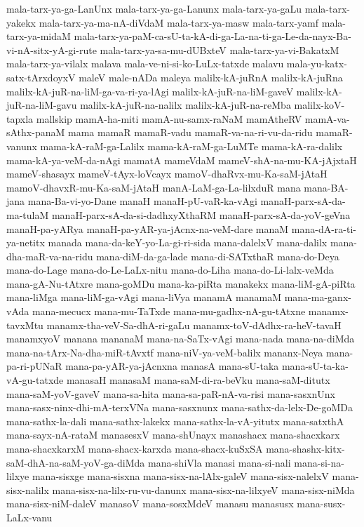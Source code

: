 {mala-tarx-ya-ga-LanUnx
mala-tarx-ya-ga-Lanunx
mala-tarx-ya-gaLu
mala-tarx-yakekx
mala-tarx-ya-ma-nA-diVdaM
mala-tarx-ya-masw
mala-tarx-yamf
mala-tarx-ya-midaM
mala-tarx-ya-paM-ca-sU-ta-kA-di-ga-La-na-ti-ga-Le-da-nayx-Ba-vi-nA-sitx-yA-gi-rute
mala-tarx-ya-sa-mu-dUBxteV
mala-tarx-ya-vi-BakatxM
mala-tarx-ya-vilalx
malava
mala-ve-ni-si-ko-LuLx-tatxde
malavu
mala-yu-katx-satx-tArxdoyxV
maleV
male-nADa
maleya
malilx-kA-juRnA
malilx-kA-juRna
malilx-kA-juR-na-liM-ga-va-ri-ya-lAgi
malilx-kA-juR-na-liM-gaveV
malilx-kA-juR-na-liM-gavu
malilx-kA-juR-na-nalilx
malilx-kA-juR-na-reMba
malilx-koV-tapxla
mallskip
mamA-ha-miti
mamA-nu-samx-raNaM
mamAtheRV
mamA-va-sAthx-panaM
mama
mamaR
mamaR-vadu
mamaR-va-na-ri-vu-da-ridu
mamaR-vanunx
mama-kA-raM-ga-Lalilx
mama-kA-raM-ga-LuMTe
mama-kA-ra-dalilx
mama-kA-ya-veM-da-nAgi
mamatA
mameVdaM
mameV-shA-na-mu-KA-jAjxtaH
mameV-shasayx
mameV-tAyx-loVcayx
mamoV-dhaRvx-mu-Ka-saM-jAtaH
mamoV-dhavxR-mu-Ka-saM-jAtaH
manA-LaM-ga-La-lilxduR
mana
mana-BA-jana
mana-Ba-vi-yo-Dane
manaH
manaH-pU-vaR-ka-vAgi
manaH-parx-sA-da-ma-tulaM
manaH-parx-sA-da-si-dadhxyXthaRM
manaH-parx-sA-da-yoV-geVna
manaH-pa-yARya
manaH-pa-yAR-ya-jAcnx-na-veM-dare
manaM
mana-dA-ra-ti-ya-netitx
manada
mana-da-keY-yo-La-gi-ri-sida
mana-dalelxV
mana-dalilx
mana-dha-maR-va-na-ridu
mana-diM-da-ga-lade
mana-di-SATxthaR
mana-do-Deya
mana-do-Lage
mana-do-Le-LaLx-nitu
mana-do-Liha
mana-do-Li-lalx-veMda
mana-gA-Nu-tAtxre
mana-goMDu
mana-ka-piRta
manakekx
mana-liM-gA-piRta
mana-liMga
mana-liM-ga-vAgi
mana-liVya
manamA
manamaM
mana-ma-ganx-vAda
mana-mecucx
mana-mu-TaTxde
mana-mu-gadhx-nA-gu-tAtxne
manamx-tavxMtu
manamx-tha-veV-Sa-dhA-ri-gaLu
manamx-toV-dAdhx-ra-heV-tavaH
manamxyoV
manana
mananaM
mana-na-SaTx-vAgi
mana-nada
mana-na-diMda
mana-na-tArx-Na-dha-miR-tAvxtf
mana-niV-ya-veM-balilx
mananx-Neya
mana-pa-ri-pUNaR
mana-pa-yAR-ya-jAcnxna
manasA
mana-sU-taka
mana-sU-ta-ka-vA-gu-tatxde
manasaH
manasaM
mana-saM-di-ra-beVku
mana-saM-ditutx
mana-saM-yoV-gaveV
mana-sa-hita
mana-sa-paR-nA-va-risi
mana-sasxnUnx
mana-sasx-ninx-dhi-mA-terxVNa
mana-sasxnunx
mana-sathx-da-lelx-De-goMDa
mana-sathx-la-dali
mana-sathx-lakekx
mana-sathx-la-vA-yitutx
mana-satxthA
mana-sayx-nA-rataM
manasesxV
mana-shUnayx
manashacx
mana-shacxkarx
mana-shacxkarxM
mana-shacx-karxda
mana-shacx-kuSxSA
mana-shashx-kitx-saM-dhA-na-saM-yoV-ga-diMda
mana-shiVla
manasi
mana-si-nali
mana-si-na-lilxye
mana-sisxge
mana-sisxna
mana-sisx-na-lAlx-galeV
mana-sisx-nalelxV
mana-sisx-nalilx
mana-sisx-na-lilx-ru-vu-danunx
mana-sisx-na-lilxyeV
mana-sisx-niMda
mana-sisx-niM-daleV
manasoV
mana-sosxMdeV
manasu
manasusx
mana-susx-LaLx-vanu
}
